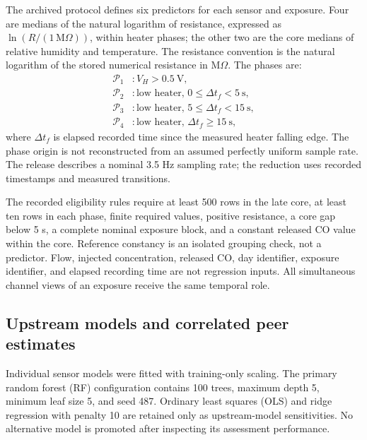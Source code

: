 The archived protocol defines six predictors for each sensor and exposure. Four are medians of the natural logarithm of resistance, expressed as $\ln(R/(1\,\mathrm{M}\Omega))$, within heater phases; the other two are the core medians of relative humidity and temperature. The resistance convention is the natural logarithm of the stored numerical resistance in M$\Omega$. The phases are:
\begin{equation}
\begin{aligned}
\mathcal{P}_1 &: V_H>0.5\ \mathrm{V},\\
\mathcal{P}_2 &: \text{low heater, }0\leq\Delta t_f<5\ \mathrm{s},\\
\mathcal{P}_3 &: \text{low heater, }5\leq\Delta t_f<15\ \mathrm{s},\\
\mathcal{P}_4 &: \text{low heater, }\Delta t_f\geq15\ \mathrm{s},
\end{aligned}
\label{eq:phases}
\end{equation}
where $\Delta t_f$ is elapsed recorded time since the measured heater falling edge. The phase origin is not reconstructed from an assumed perfectly uniform sample rate. The release describes a nominal 3.5 Hz sampling rate; the reduction uses recorded timestamps and measured transitions.

The recorded eligibility rules require at least 500 rows in the late core, at least ten rows in each phase, finite required values, positive resistance, a core gap below 5 s, a complete nominal exposure block, and a constant released CO value within the core. Reference constancy is an isolated grouping check, not a predictor. Flow, injected concentration, released CO, day identifier, exposure identifier, and elapsed recording time are not regression inputs. All simultaneous channel views of an exposure receive the same temporal role.

\subsection{Upstream models and correlated peer estimates}
Individual sensor models were fitted with training-only scaling. The primary random forest (RF) configuration contains 100 trees, maximum depth 5, minimum leaf size 5, and seed 487. Ordinary least squares (OLS) and ridge regression with penalty 10 are retained only as upstream-model sensitivities. No alternative model is promoted after inspecting its assessment performance.

